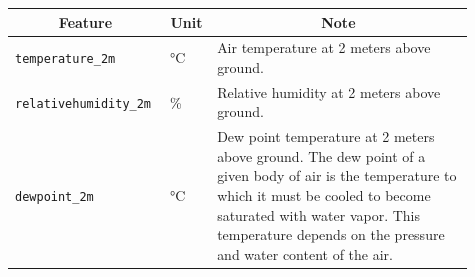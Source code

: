 \newpage
\begin{longtable}[c]{p{0.3\linewidth}|p{0.07\linewidth}| p{0.54\linewidth}}
	\hline
	\multicolumn{1}{c|}{\textbf{Feature}}                                                                                                                                                   &
	\multicolumn{1}{c|}{\textbf{Unit}}                                                                                                                                                      &
	\multicolumn{1}{c}{\textbf{Note}}                                                                                                                                                                                                                                                                                                                                                                                                                                                                                          \\
	\hline
	\verb|temperature_2m|                                                                                                                                                                   & °C                      & Air temperature at 2 meters above ground.                                                                                                                                                                                                                                                              \\
	\verb|relativehumidity_2m|                                                                                                                                                              & \%                      & Relative humidity at 2 meters above ground.                                                                                                                                                                                                                                                            \\
	\verb|dewpoint_2m|                                                                                                                                                                      & °C                      & Dew point temperature at 2 meters above ground. The dew point of a given body of air is the temperature to which it must be cooled to become saturated with water vapor. This temperature depends on the pressure and water content of the air.                                                        \\ %

\end{longtable}
